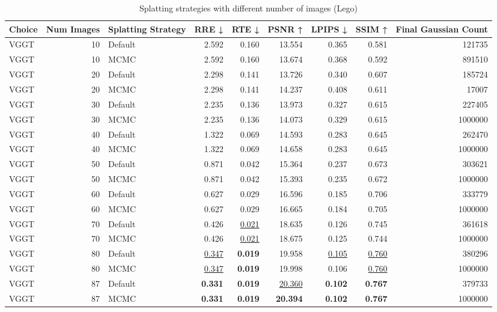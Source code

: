 \begin{table}[H]
\caption{Splatting strategies with different number of images (Lego)}
\label{tab:09_splatting_strategy_lego}
\begin{tabular}{lrlrrrrrr}
\toprule
Choice & Num Images & Splatting Strategy & RRE ↓ & RTE ↓ & PSNR ↑ & LPIPS ↓ & SSIM ↑ & Final Gaussian Count \\
\midrule
VGGT & 10 & Default & 2.592 & 0.160 & 13.554 & 0.365 & 0.581 & 121735 \\
VGGT & 10 & MCMC & 2.592 & 0.160 & 13.674 & 0.368 & 0.592 & 891510 \\
VGGT & 20 & Default & 2.298 & 0.141 & 13.726 & 0.340 & 0.607 & 185724 \\
VGGT & 20 & MCMC & 2.298 & 0.141 & 14.237 & 0.408 & 0.611 & 17007 \\
VGGT & 30 & Default & 2.235 & 0.136 & 13.973 & 0.327 & 0.615 & 227405 \\
VGGT & 30 & MCMC & 2.235 & 0.136 & 14.073 & 0.329 & 0.615 & 1000000 \\
VGGT & 40 & Default & 1.322 & 0.069 & 14.593 & 0.283 & 0.645 & 262470 \\
VGGT & 40 & MCMC & 1.322 & 0.069 & 14.658 & 0.283 & 0.645 & 1000000 \\
VGGT & 50 & Default & 0.871 & 0.042 & 15.364 & 0.237 & 0.673 & 303621 \\
VGGT & 50 & MCMC & 0.871 & 0.042 & 15.393 & 0.235 & 0.672 & 1000000 \\
VGGT & 60 & Default & 0.627 & 0.029 & 16.596 & 0.185 & 0.706 & 333779 \\
VGGT & 60 & MCMC & 0.627 & 0.029 & 16.665 & 0.184 & 0.705 & 1000000 \\
VGGT & 70 & Default & 0.426 & \underline{0.021} & 18.635 & 0.126 & 0.745 & 361618 \\
VGGT & 70 & MCMC & 0.426 & \underline{0.021} & 18.675 & 0.125 & 0.744 & 1000000 \\
VGGT & 80 & Default & \underline{0.347} & \textbf{0.019} & 19.958 & \underline{0.105} & \underline{0.760} & 380296 \\
VGGT & 80 & MCMC & \underline{0.347} & \textbf{0.019} & 19.998 & 0.106 & \underline{0.760} & 1000000 \\
VGGT & 87 & Default & \textbf{0.331} & \textbf{0.019} & \underline{20.360} & \textbf{0.102} & \textbf{0.767} & 379733 \\
VGGT & 87 & MCMC & \textbf{0.331} & \textbf{0.019} & \textbf{20.394} & \textbf{0.102} & \textbf{0.767} & 1000000 \\
\bottomrule
\end{tabular}
\end{table}
